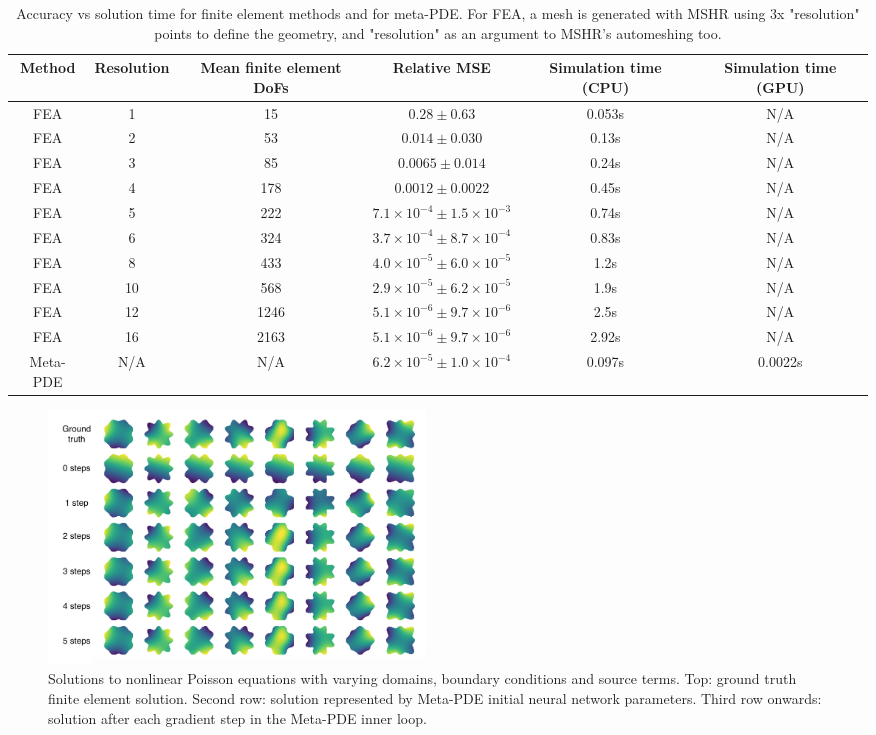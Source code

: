 \begin{table}
\begin{adjustbox}{max width=\textwidth}
\begin{tabular}{|c|ccccc|}
 \hline
 Method & Resolution & Mean finite element DoFs & Relative MSE & Simulation time (CPU) & Simulation time (GPU) \\
 \hline
 FEA & 1 & 15 & $0.28 \pm 0.63$ & 0.053s & N/A \\
 FEA & 2 & 53 & $0.014 \pm 0.030$ & 0.13s & N/A \\
 FEA & 3 & 85 & $0.0065 \pm 0.014$ & 0.24s & N/A \\
 FEA & 4 & 178 & $0.0012 \pm 0.0022$ & 0.45s & N/A \\
 FEA & 5 & 222 & $7.1\times 10^{-4} \pm 1.5\times 10^{-3}$ & 0.74s & N/A \\
 FEA & 6 & 324 & $3.7\times 10^{-4} \pm 8.7\times 10^{-4}$ & 0.83s & N/A \\
 FEA & 8 & 433 & $4.0\times 10^{-5} \pm 6.0\times 10^{-5}$ & 1.2s & N/A \\
 FEA & 10 & 568 & $2.9\times 10^{-5} \pm 6.2\times 10^{-5}$ & 1.9s & N/A \\
 FEA & 12 & 1246 & $5.1\times 10^{-6} \pm 9.7\times 10^{-6}$ & 2.5s & N/A \\
 FEA & 16 & 2163  & $5.1\times 10^{-6} \pm 9.7\times 10^{-6}$ & 2.92s & N/A \\
 Meta-PDE & N/A & N/A & $6.2\times 10^{-5} \pm 1.0\times 10^{-4}$  & 0.097s & 0.0022s \\
 \hline
\end{tabular}
\end{adjustbox}
\caption{
Accuracy vs solution time for finite element methods and for meta-PDE.
For FEA, a mesh is generated with MSHR using 3x "resolution" points
to define the geometry, and "resolution" as an argument to MSHR's
automeshing too.}
\label{tbl:results}
\end{table}

\begin{figure}[t]
  \centering
\includegraphics[width=10cm]{figures/poisson_meta_labeled.png}
\caption{\small
Solutions to nonlinear Poisson equations with varying domains, boundary conditions
and source terms. Top: ground truth finite element solution.
Second row: solution represented by Meta-PDE initial neural network parameters.
Third row onwards: solution after each gradient step in the Meta-PDE inner loop.}%
\label{fig:results_per_step}%
\end{figure}

